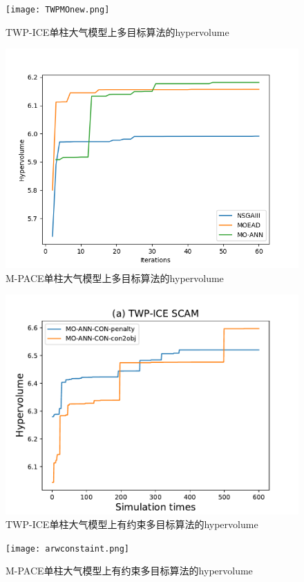 \begin{figure}[H] %
  \centering
  \texttt{[image: TWPMOnew.png]}
  \caption{TWP-ICE单柱大气模型上多目标算法的hypervolume}
  \label{fig:xfig1}
\end{figure} 
\begin{figure}[H] %
  \centering
  \includegraphics[scale=0.6]{figures/ARW-MO.png}
  \caption{M-PACE单柱大气模型上多目标算法的hypervolume}
  \label{fig:xfig1}
\end{figure} 

\begin{figure}[H] %
  \centering
  \includegraphics[scale=0.6]{figures/twpconstraint.pdf}
  \caption{TWP-ICE单柱大气模型上有约束多目标算法的hypervolume}
  \label{fig:xfig1}
\end{figure} 
\begin{figure}[H] %
  \centering
  \texttt{[image: arwconstaint.png]}
  \caption{M-PACE单柱大气模型上有约束多目标算法的hypervolume}
  \label{fig:xfig1}
\end{figure}

